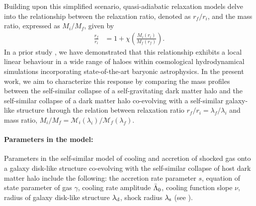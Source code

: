 Building upon this simplified scenario, quasi-adiabatic relaxation models delve into the relationship between the relaxation ratio, denoted as $r_f/r_i$, and the mass ratio, expressed as $M_i/M_f$, given by \citep[]{2010Abadi_NFBS,2011TeyssierMMDM,2021ParanjapeTirthSheth,2023Velmani&Paranjape} %
\begin{align}
\frac{r_f}{r_i} &= 1 + \chi \left( \frac{M_i(r_i)}{M_f(r_f)} \right) .
\label{eq:qAR}
\end{align}
In a prior study \cite{2023Velmani&Paranjape}, we have demonstrated that this relationship exhibits a local linear behaviour in a wide range of haloes within cosmological hydrodynamical simulations incorporating state-of-the-art baryonic astrophysics. In the present work, we aim to characterize this response by comparing the mass profiles between the self-similar collapse of a self-gravitating dark matter halo and the self-similar collapse of a dark matter halo co-evolving with a self-similar galaxy-like structure through the relation between relaxation ratio 
$r_f/r_i=\lambda_f/\lambda_i$ and mass ratio, $M_i/M_f=\mathcal{M}_i(\lambda_i)/\mathcal{M}_f(\lambda_f)$.



\paragraph{Parameters in the model:}
Parameters in the self-similar model of cooling and accretion of shocked gas onto a galaxy disk-like structure co-evolving with the self-similar collapse of host dark matter halo include the following:
the accretion rate parameter $s$, equation of state parameter of gas $\gamma$, cooling rate amplitude $\Bar{\Lambda}_0$, cooling function slope $\nu$, radius of galaxy disk-like structure $\lambda_{\rm d}$, shock radius $\lambda_{\rm s}$ (see ).


